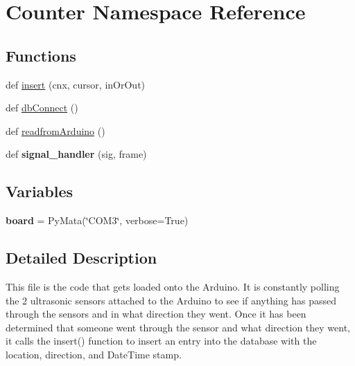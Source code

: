 \hypertarget{namespace_counter}{}\section{Counter Namespace Reference}
\label{namespace_counter}
\subsection*{Functions}
\begin{DoxyCompactItemize}
\item 
def \hyperlink{namespace_counter_a49e12affeadafd8435a97b06057e2dfe}{insert} (cnx, cursor, in\+Or\+Out)
\item 
def \hyperlink{namespace_counter_a8e429790189b662dee33d000087cb1f8}{db\+Connect} ()
\item 
def \hyperlink{namespace_counter_a27dffb0b62e84c35f52de71e22b3ee2f}{readfrom\+Arduino} ()
\item 
def {\bfseries signal\+\_\+handler} (sig, frame)\hypertarget{namespace_counter_abd6cd9e7a4e8224f96c5d38e18db6291}{}\label{namespace_counter_abd6cd9e7a4e8224f96c5d38e18db6291}

\end{DoxyCompactItemize}
\subsection*{Variables}
\begin{DoxyCompactItemize}
\item 
{\bfseries board} = Py\+Mata(\char`\"{}C\+O\+M3\char`\"{}, verbose=True)\hypertarget{namespace_counter_a270588806e1d16ef8beae527f6438f20}{}\label{namespace_counter_a270588806e1d16ef8beae527f6438f20}

\end{DoxyCompactItemize}


\subsection{Detailed Description}
\begin{DoxyVerb}This file is the code that gets loaded onto the Arduino. It is constantly polling the 2 ultrasonic sensors 
attached to the Arduino to see if anything has passed through the sensors and in what direction they went.
Once it has been determined that someone went through the sensor and what direction they went, it calls the insert() 
function to insert an entry into the database with the location, direction, and DateTime stamp.
\end{DoxyVerb}
 

